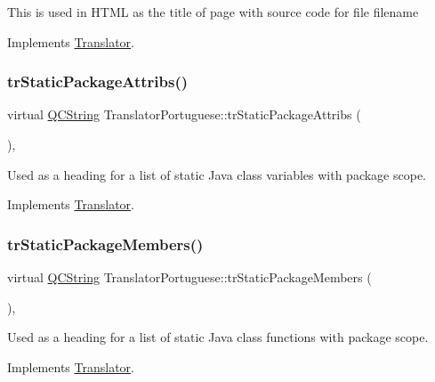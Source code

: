 This is used in H\+T\+ML as the title of page with source code for file filename 

Implements \mbox{\hyperlink{class_translator}{Translator}}.

\mbox{\label{class_translator_portuguese_a6e55746ec13ec111016463fa1ea8a294}} 
\subsubsection{\texorpdfstring{trStaticPackageAttribs()}{trStaticPackageAttribs()}}
{\footnotesize\ttfamily virtual \mbox{\hyperlink{class_q_c_string}{Q\+C\+String}} Translator\+Portuguese\+::tr\+Static\+Package\+Attribs (\begin{DoxyParamCaption}{ }\end{DoxyParamCaption})\hspace{0.3cm}{\ttfamily [inline]}, {\ttfamily [virtual]}}

Used as a heading for a list of static Java class variables with package scope. 

Implements \mbox{\hyperlink{class_translator}{Translator}}.

\mbox{\label{class_translator_portuguese_a4aebc54ec4c1ab1e8a02d55a801bc770}} 
\subsubsection{\texorpdfstring{trStaticPackageMembers()}{trStaticPackageMembers()}}
{\footnotesize\ttfamily virtual \mbox{\hyperlink{class_q_c_string}{Q\+C\+String}} Translator\+Portuguese\+::tr\+Static\+Package\+Members (\begin{DoxyParamCaption}{ }\end{DoxyParamCaption})\hspace{0.3cm}{\ttfamily [inline]}, {\ttfamily [virtual]}}

Used as a heading for a list of static Java class functions with package scope. 

Implements \mbox{\hyperlink{class_translator}{Translator}}.

